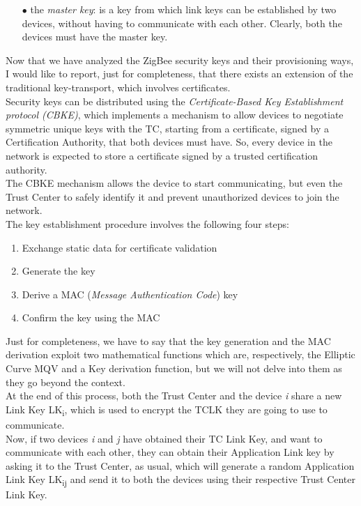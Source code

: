 \documentclass[12pt]{report}
\begin{document}
{\begin{itemize}
\item[$\bullet$] the \emph{master key}: is a key from which link keys can be established by two devices, without having to communicate with each other. Clearly, both the devices must have the master key.

\end{itemize}

Now that we have analyzed the ZigBee security keys and their provisioning ways, I would like to report, just for completeness, that there exists an extension of the traditional key-transport, which involves certificates.\\
Security keys can be distributed using the \emph{Certificate-Based Key Establishment protocol (CBKE)}, which implements a mechanism to allow devices to negotiate symmetric unique keys with the TC, starting from a certificate, signed by a Certification Authority, that both devices must have. So, every device in the network is expected to store a certificate signed by a trusted certification authority.\\
The CBKE mechanism allows the device to start communicating, but even the Trust Center to safely identify it and prevent unauthorized devices to join the network.\\
The key establishment procedure involves the following four steps:

\begin{enumerate}
\setlength{\itemindent}{+5mm}
\item Exchange static data for certificate validation
\item Generate the key
\item Derive a MAC (\emph{Message Authentication Code}) key
\item Confirm the key using the MAC
 \end{enumerate}

Just for completeness, we have to say that the key generation and the MAC derivation exploit two mathematical functions which are, respectively, the Elliptic Curve MQV and a Key derivation function, but we will not delve into them as they go beyond the context.\\
At the end of this process, both the Trust Center and the device \emph{i} share a new Link Key LK\textsubscript{i}, which is used to encrypt the TCLK they are going to use to communicate.\\
Now, if two devices \emph{i} and \emph{j} have obtained their TC Link Key, and want to communicate with each other, they can obtain their Application Link key by asking it to the Trust Center, as usual, which will generate a random Application Link Key LK\textsubscript{ij} and send it to both the devices using their respective Trust Center Link Key.\\

}
\end{document}
